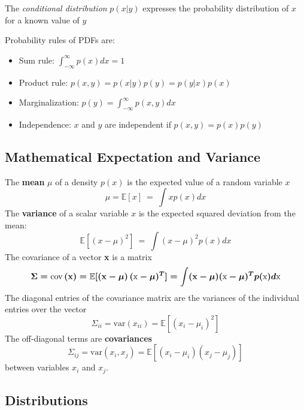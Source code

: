 \documentclass[11pt]{article}
\theoremstyle{plain}
\theoremstyle{definition}
\begin{document}
The \textit{conditional distribution} $p(x|y)$ expresses the probability distribution of $x$ for a known value of $y$

Probability rules of PDFs are:
\begin{itemize}
	\item Sum rule: $\int_{-\infty}^{\infty}p(x)dx=1$
	\item Product rule: $p(x,y) = p(x|y)p(y)=p(y|x)p(x)$
	\item Marginalization: $p(y) = \int_{-\infty}^{\infty} p(x,y) dx$
	\item Independence: $x$ and $y$ are independent if $p(x,y)=p(x)p(y)$
\end{itemize}

\subsection{Mathematical Expectation and Variance}
The \textbf{mean} $\mu$ of a density $p(x)$ is the expected value of a random variable $x$
\begin{equation}
\mu= \mathbb{E}[x] \ = \ \int x p(x) dx
\end{equation}
The \textbf{variance} of a scalar variable $x$ is the expected squared deviation from the mean:
\begin{equation}
\mathbb{E}[(x-\mu)^2] \ = \ \int (x-\mu)^2 p(x) dx
\end{equation}
The covariance of a vector \textbf{x} is a matrix
\begin{equation}
\Sigma = \text{cov}\left(\textbf{x}\right) = \mathbb{E}[\left(\textbf{x}-\boldmath{\mu}\right)(\text{x}-\boldmath{\mu})^T] = \int (\textbf{x}-\boldmath{\mu})(\text{x}-\boldmath{\mu})^T p(\text{x}) d\text{x}
\end{equation}
The diagonal entries of the covariance matrix are the variances of the individual entries over the vector
\begin{equation}
\Sigma_{ii} = \text{var}(x_{ii}) = \mathbb{E}[(x_i-\mu_i)^2]
\end{equation}
The off-diagonal terms are \textbf{covariances}
\begin{equation}
\Sigma_{ij} = \text{var}(x_{i},x_{j}) = \mathbb{E}[(x_i-\mu_i)(x_j-\mu_j)]
\end{equation}
between variables $x_i$ and $x_j$.

\subsection{Distributions}
\end{document}
